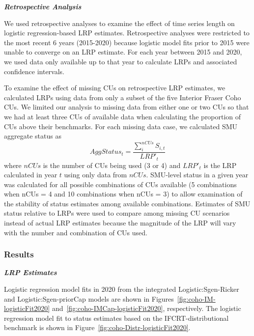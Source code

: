 \documentclass[11pt]{book}
\begin{document}
\textbf{\emph{Retrospective Analysis}}

We used retrospective analyses to examine the effect of time series length on logistic regression-based LRP estimates. Retrospective analyses were restricted to the most recent 6 years (2015-2020) because logistic model fits prior to 2015 were unable to converge on an LRP estimate. For each year between 2015 and 2020, we used data only available up to that year to calculate LRPs and associated confidence intervals.

To examine the effect of missing CUs on retrospective LRP estimates, we calculated LRPs using data from only a subset of the five Interior Fraser Coho CUs. We limited our analysis to missing data from either one or two CUs so that we had at least three CUs of available data when calculating the proportion of CUs above their benchmarks. For each missing data case, we calculated SMU aggregate status as
\begin{equation}
  AggStatus_t = \frac{\sum_{i}^{nCUs} S_{i,t}}{LRP'_t}
   \label{eq:status}
\end{equation}
where \(nCUs\) is the number of CUs being used (3 or 4) and \(LRP'_t\) is the LRP calculated in year \(t\) using only data from \(nCUs\). SMU-level status in a given year was calculated for all possible combinations of CUs available (5 combinations when nCUs = 4 and 10 combinations when nCUs = 3) to allow examination of the stability of status estimates among available combinations. Estimates of SMU status relative to LRPs were used to compare among missing CU scenarios instead of actual LRP estimates because the magnitude of the LRP will vary with the number and combination of CUs used.

\hypertarget{results-1}{%
\subsubsection{Results}\label{results-1}}

\textbf{\emph{LRP Estimates}}

Logistic regression model fits in 2020 from the integrated Logistic:Sgen-Ricker and Logistic:Sgen-priorCap models are shown in Figures~\ref{fig:coho-IM-logisticFit2020} and~\ref{fig:coho-IMCap-logisticFit2020}, respectively. The logistic regression model fit to status estimates based on the IFCRT-distributional benchmark is shown in Figure~\ref{fig:coho-Distr-logisticFit2020}.
\end{document}
